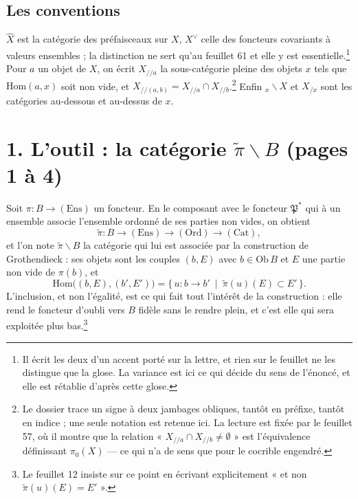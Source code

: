 \documentclass[11pt,a4paper]{article}
\begin{document}
\subsection*{Les conventions}

$\widehat{X}$ est la catégorie des préfaisceaux sur $X$, $X^{\vee}$ celle des
foncteurs covariants à valeurs ensembles ; la distinction ne sert qu'au
feuillet 61 et elle y est essentielle.\footnote{Il écrit les deux d'un accent
porté sur la lettre, et rien sur le feuillet ne les distingue que la glose. La
variance est ici ce qui décide du sens de l'énoncé, et elle est rétablie
d'après cette glose.} Pour $a$ un objet de $X$, on écrit $X_{/\!/a}$ la
sous-catégorie pleine des objets $x$ tels que $\mathrm{Hom}(a,x)$ soit non
vide, et $X_{/\!/(a,b)} = X_{/\!/a} \cap X_{/\!/b}$.\footnote{Le dossier
trace un signe à deux jambages obliques, tantôt en préfixe, tantôt en indice ;
une seule notation est retenue ici. La lecture est fixée par le feuillet 57,
où il montre que la relation « $X_{/\!/a} \cap X_{/\!/b} \neq \emptyset$ » est
l'équivalence définissant $\pi_{0}(X)$ — ce qui n'a de sens que pour le
cocrible engendré.} Enfin ${}_{x}\backslash X$ et $X_{/x}$ sont les catégories
au-dessous et au-dessus de $x$.

\section*{1. L'outil : la catégorie $\widetilde{\pi}\backslash B$ (pages 1 à 4)}

Soit $\pi : B \to (\mathrm{Ens})$ un foncteur. En le composant avec le
foncteur $\mathfrak{P}^{*}$ qui à un ensemble associe l'ensemble ordonné de
ses parties non vides, on obtient
\[
  \widetilde{\pi} : B \longrightarrow (\mathrm{Ens})
  \longrightarrow (\mathrm{Ord}) \longrightarrow (\mathrm{Cat}),
\]
et l'on note $\widetilde{\pi}\backslash B$ la catégorie qui lui est associée
par la construction de Grothendieck : ses objets sont les couples $(b,E)$ avec
$b \in \mathrm{Ob}\,B$ et $E$ une partie non vide de $\pi(b)$, et
\[
  \mathrm{Hom}\bigl((b,E),(b',E')\bigr)
  = \{\, u : b \to b' \ \mid \ \widetilde{\pi}(u)(E) \subset E' \,\}.
\]
L'inclusion, et non l'égalité, est ce qui fait tout l'intérêt de la
construction : elle rend le foncteur d'oubli vers $B$ fidèle sans le rendre
plein, et c'est elle qui sera exploitée plus bas.\footnote{Le feuillet 12
insiste sur ce point en écrivant explicitement « et non
$\widetilde{\pi}(u)(E) = E'$ ».}
\end{document}
